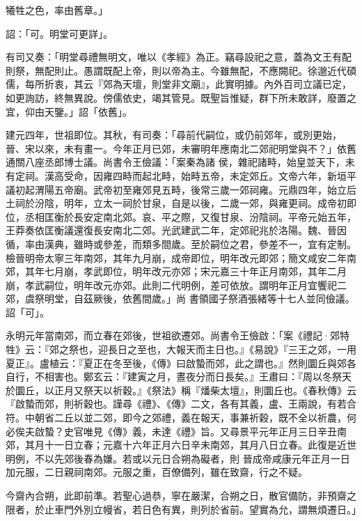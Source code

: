 \begin{pinyinscope}
 犧牲之色，率由舊章。」



 詔：「可。明堂可更詳」。



 有司又奏：「明堂尋禮無明文，唯以《孝經》為正。竊尋設祀之意，蓋為文王有配則祭，無配則止。愚謂既配上帝，則以帝為主。今雖無配，不應闕祀。徐邈近代碩儒，每所折衷，其云『郊為天壇，則堂非文廟』，此實明據。內外百司立議已定，如更詢訪，終無異說。傍儒依史，竭其管見。既聖旨惟疑，群下所未敢詳，廢置之宜，仰由天鑒。」詔「依舊」。



 建元四年，世祖即位。其秋，有司奏：「尋前代嗣位，或仍前郊年，或別更始，晉、宋以來，未有畫一。今年正月已郊，未審明年應南北二郊祀明堂與不？」依舊通關八座丞郎博士議。尚書令王儉議：「案秦為諸
 侯，雜祀諸畤，始皇並天下，未有定祠。漢高受命，因雍四畤而起北畤，始畤五帝，未定郊丘。文帝六年，新垣平議初起渭陽五帝廟。武帝初至雍郊見五畤，後常三歲一郊祠雍。元鼎四年，始立后土祠於汾陰，明年，立太一祠於甘泉，自是以後，二歲一郊，與雍更祠。成帝初即位，丞相匡衡於長安定南北郊。哀、平之際，又復甘泉、汾陰祠。平帝元始五年，王莽奏依匡衡議還復長安南北二郊。光武建武二年，定郊祀兆於洛陽。魏、晉因循，率由漢典，雖時或參差，而類多間歲。至於嗣位之君，參差不一，宜有定制。檢晉明帝太寧三年南郊，其年九月崩，成帝即位，明年改元即郊；簡文咸安二年南郊，其年七月崩，孝武即位，明年改元亦郊；宋元嘉三十年正月南郊，其年二月崩，孝武嗣位，明年改元亦郊。此則二代明例，差可依放。謂明年正月宜饗祀二郊，虞祭明堂，自茲厥後，依舊間歲。」尚
 書領國子祭酒張緒等十七人並同儉議。詔「可」。



 永明元年當南郊，而立春在郊後，世祖欲遷郊。尚書令王儉啟：「案《禮記·郊特牲》云：『郊之祭也，迎長日之至也，大報天而主日也。』《易說》『三王之郊，一用夏正』。盧植云：『夏正在冬至後，《傳》曰啟蟄而郊，此之謂也。』然則圜丘與郊各自行，不相害也。鄭玄云：『建寅之月，晝夜分而日長矣。』王肅曰：『周以冬祭天於圜丘，以正月又祭天以祈穀。』《祭法》稱『燔柴太壇』，則圜丘也。《春秋傳》云『啟蟄而郊，則祈穀也。謹尋《禮》、《傳》二文，各有其義，盧、王兩說，有若合符。中朝省二丘以並二郊，即今之郊禮，義在報天，事兼祈穀，既不全以祈農，何必俟夫啟蟄？史官唯見《傳》義，未達《禮》旨。又尋景平元年正月三日辛丑南郊，其月十一日立春；元嘉十六年正月六日辛未南郊，其月八日立春。此復是近世明例，不以先郊後春為嫌。若或以元日合朔為礙者，則
 晉成帝咸康元年正月一日加元服，二日親祠南郊。元服之重，百僚備列，雖在致齋，行之不疑。



 今齋內合朔，此即前準。若聖心過恭，寧在嚴潔，合朔之日，散官備防，非預齋之限者，於止車門外別立幔省，若日色有異，則列於省前。望實為允，謂無煩遷日。」




\end{pinyinscope}
